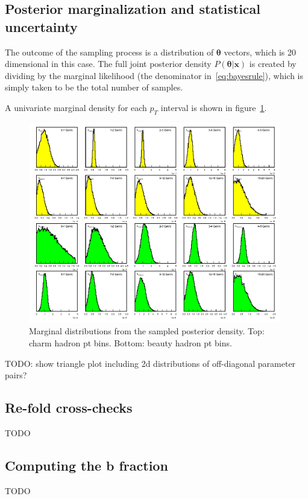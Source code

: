 \documentclass[12pt]{article}
\newcommand{\pt}{p_T}
\newcommand{\xvec}{\mathbf{x}}
\newcommand{\thetavec}{\mathbf{\theta}}
\newcommand{\post}{P(\thetavec|\xvec)}
\begin{document}
\subsection{Posterior marginalization and statistical uncertainty} \label{sec:marg}
The outcome of the sampling process is a distribution of $\thetavec$ vectors, which is 20 dimensional in this case. The full joint posterior density $\post$ is created by dividing by the marginal likelihood (the denominator in~\ref{eq:bayesrule}), which is simply taken to be the total number of samples.

A univariate marginal density for each $\pt$ interval is shown in figure~\ref{fig:post}.
\begin{figure}[tb]
  \begin{center}
    \includegraphics[width=0.98\textwidth]{AuAu200MB/2/posterior}
  \end{center}
  \caption{Marginal distributions from the sampled posterior density. Top: charm hadron pt bins. Bottom: beauty hadron pt bins.}
  \label{fig:post}
\end{figure}
TODO: show triangle plot including 2d distributions of off-diagonal parameter pairs?

\subsection{Re-fold cross-checks}
TODO
\subsection{Computing the b fraction}
TODO
\end{document}
